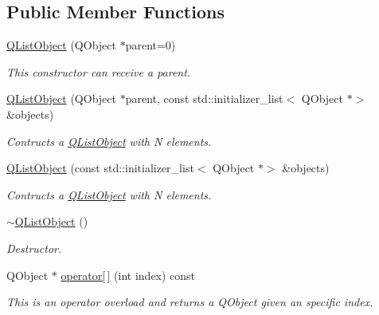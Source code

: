 \subsection*{Public Member Functions}
\begin{DoxyCompactItemize}
\item 
\hyperlink{class_q_list_object_a035ee9dc9f035443995b9419d32b07da}{Q\+List\+Object} (Q\+Object $\ast$parent=0)
\begin{DoxyCompactList}\small\item\em This constructor can receive a parent. \end{DoxyCompactList}\item 
\mbox{\label{class_q_list_object_acc9db03436b596a2f274b01a81e8931c}} 
\hyperlink{class_q_list_object_acc9db03436b596a2f274b01a81e8931c}{Q\+List\+Object} (Q\+Object $\ast$parent, const std\+::initializer\+\_\+list$<$ Q\+Object $\ast$$>$ \&objects)
\begin{DoxyCompactList}\small\item\em Contructs a \hyperlink{class_q_list_object}{Q\+List\+Object} with N elements. \end{DoxyCompactList}\item 
\mbox{\label{class_q_list_object_af05889c002163fc36f5eaf12b88363fd}} 
\hyperlink{class_q_list_object_af05889c002163fc36f5eaf12b88363fd}{Q\+List\+Object} (const std\+::initializer\+\_\+list$<$ Q\+Object $\ast$$>$ \&objects)
\begin{DoxyCompactList}\small\item\em Contructs a \hyperlink{class_q_list_object}{Q\+List\+Object} with N elements. \end{DoxyCompactList}\item 
\mbox{\label{class_q_list_object_a01e06b1d249cf0dbe92b826fed0e7b76}} 
\hyperlink{class_q_list_object_a01e06b1d249cf0dbe92b826fed0e7b76}{$\sim$\+Q\+List\+Object} ()
\begin{DoxyCompactList}\small\item\em Destructor. \end{DoxyCompactList}\item 
Q\+Object $\ast$ \hyperlink{class_q_list_object_a9b87308d291c9699a36849e5d8bfedd4}{operator\mbox{[}$\,$\mbox{]}} (int index) const
\begin{DoxyCompactList}\small\item\em This is an operator overload and returns a Q\+Object given an specific index. \end{DoxyCompactList}\item 

\end{DoxyCompactItemize}
